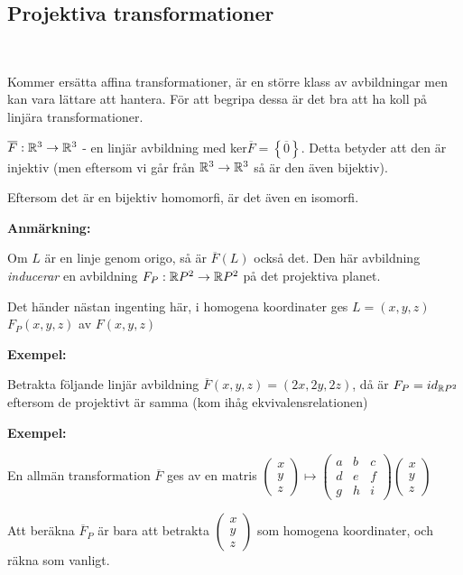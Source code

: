 \subsection{Projektiva transformationer}\hfill\\\par
\noindent Kommer ersätta affina transformationer, är en större klass av avbildningar men kan vara lättare att hantera. För att begripa dessa är det bra att ha koll på linjära transformationer.
\par\bigskip
\noindent $\overline{F}:\mathbb{R}^3\to\mathbb{R}^3$ - en linjär avbildning med ker$\overline{F} = \left\{\overline{0}\right\}$. Detta betyder att den är injektiv (men eftersom vi går från $\mathbb{R}^3\to\mathbb{R}^3$ så är den även bijektiv).
\par\bigskip
\noindent Eftersom det är en bijektiv homomorfi, är det även en isomorfi.
\par\bigskip
\noindent\textbf{Anmärkning:}\par
\noindent Om $L$ är en linje genom origo, så är $\overline{F}(L)$ också det. Den här avbildning \textit{inducerar} en avbildning $F_P:\mathbb{R} P^2\to\mathbb{R} P^2$ på det projektiva planet.\par
\noindent Det händer nästan ingenting här, i homogena koordinater ges $L=(x,y,z)$ $F_P(x,y,z)$ av $F(x,y,z)$
\par\bigskip
\noindent\textbf{Exempel:}\par
\noindent Betrakta följande linjär avbildning $\overline{F}(x,y,z) = (2x,2y,2z)$, då är $F_P = id_{\mathbb{R} P^2}$ eftersom de projektivt är samma (kom ihåg ekvivalensrelationen)
\par\bigskip
\noindent\textbf{Exempel:}\par
\noindent En allmän transformation $\overline{F}$ ges av en matris $\begin{pmatrix}x\\y\\z\end{pmatrix}\mapsto\begin{pmatrix}a&b&c\\d&e&f\\g&h&i\end{pmatrix}\begin{pmatrix}x\\y\\z\end{pmatrix}$\par
\noindent Att beräkna $\overline{F}_P$ är bara att betrakta $\begin{pmatrix}x\\y\\z\end{pmatrix}$ som homogena koordinater, och räkna som vanligt.
